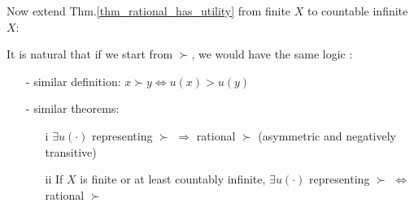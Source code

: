 Now extend Thm.\ref{thm_rational_has_utility} from finite $X$ to countable infinite $X$:
\begin{theorem}\label{thm_rational_has_utility_countable}
    
\end{theorem}


It is natural that if we start from $\succ$, we would have the same logic \citep[See][Page 30]{kreps1990acourse}:

\begin{enumerate}
    \item[-] similar definition: $x\succ y\Leftrightarrow u(x)>u(y)$
    \item[-] similar theorems: 
    \begin{enumerate}
        \item[i] $\exists u(\cdot)$ representing $\succ$ $\Rightarrow$ rational $\succ$ (asymmetric and negatively transitive)
        \item[ii] If $X$ is finite or at least countably infinite, $\exists u(\cdot)$ representing $\succ$ $\Leftrightarrow$ rational $\succ$
    \end{enumerate} 
\end{enumerate}